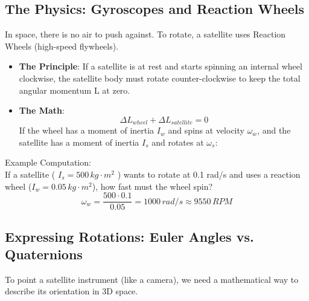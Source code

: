 \documentclass[a4paper,10pt]{article}
\begin{document}
\subsection{The Physics: Gyroscopes and Reaction Wheels}
In space, there is no air to push against. To rotate, a satellite uses Reaction Wheels (high-speed flywheels).
\begin{itemize}
\item \textbf{The Principle}: If a satellite is at rest and starts spinning an internal wheel clockwise, the satellite body must rotate counter-clockwise to keep the total angular momentum L at zero.
\item \textbf{The Math}:
\[
 \Delta L_{wheel} +  \Delta L_{satellite} = 0
\]
If the wheel has a moment of inertia \(I_w\) and spins at velocity \(\omega_w\), and the satellite has a moment of inertia \(I_s\) and rotates at \(\omega_s\):
\end{itemize}
Example Computation:\\
If a satellite ( \(I_s = 500\,kg \cdot m^2 \) ) wants to rotate at 0.1 rad/s and uses a reaction wheel (\(I_w = 0.05\,kg \cdot m^2\)), how fast must the wheel spin?
\[
 \omega_w = \frac{500 \cdot 0.1}{0.05} = 1000\, rad/s \approx 9550\,RPM
\]
\subsection{Expressing Rotations: Euler Angles vs. Quaternions}
To point a satellite instrument (like a camera), we need a mathematical way to describe its orientation in 3D space.
\end{document}
